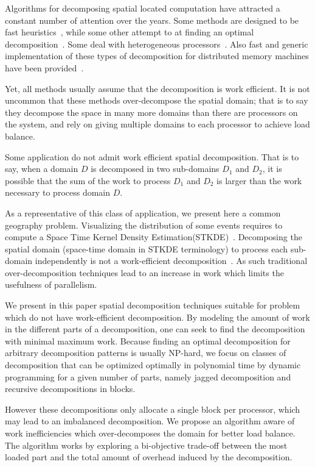 \documentclass[10pt, conference, compsocconf]{IEEEtran}
\begin{document}
Algorithms for decomposing spatial located computation have attracted
a constant number of attention over the years. Some methods are
designed to be fast heuristics~\cite{berger87}, while some other attempt to
at finding an optimal decomposition~\cite{saule12-jpdc-spart}. Some deal with
heterogeneous processors~\cite{pinar08}. Also fast and generic
implementation of these types of decomposition for distributed memory
machines have been provided~\cite{DeveciRDC16}.

Yet, all methods usually assume that the decomposition is work
efficient. It is not uncommon that these methods over-decompose the
spatial domain; that is to say they decompose the space in many more
domains than there are processors on the system, and rely on giving
multiple domains to each processor to achieve load balance.

Some application do not admit work efficient spatial
decomposition. That is to say, when a domain $D$ is decomposed in two
sub-domains $D_1$ and $D_2$, it is possible that the sum of the work to
process $D_1$ and $D_2$ is larger than the work necessary to process
domain $D$.

As a representative of this class of application, we present here
a common geography problem. Visualizing the distribution of some events
requires to compute a Space Time Kernel Density
Estimation(STKDE)~\cite{delmelle2013spatio}. Decomposing the spatial domain
(space-time domain in STKDE terminology) to process each sub-domain
independently is not a work-efficient decomposition~\cite{Saule17-ICPP}. As
such traditional over-decomposition techniques lead to an increase in
work which limits the usefulness of parallelism.

We present in this paper spatial decomposition techniques suitable for
problem which do not have work-efficient decomposition. By modeling
the amount of work in the different parts of a decomposition, one can
seek to find the decomposition with minimal maximum work. Because
finding an optimal decomposition for arbitrary decomposition patterns
is usually NP-hard, we focus on classes of decomposition that can be
optimized optimally in polynomial time by dynamic programming for a
given number of parts, namely jagged decomposition and recursive
decompositions in blocks.

However these decompositions only allocate a single block per
processor, which may lead to an imbalanced decomposition. We propose
an algorithm aware of work inefficiencies which over-decomposes the
domain for better load balance. The algorithm works by exploring a
bi-objective trade-off between the most loaded part and the total
amount of overhead induced by the decomposition.
\end{document}
